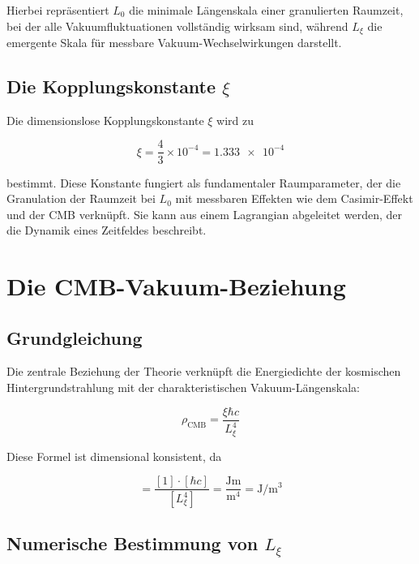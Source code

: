 	Hierbei repräsentiert \( L_0 \) die minimale Längenskala einer granulierten Raumzeit, bei der alle Vakuumfluktuationen vollständig wirksam sind, während \( L_\xi \) die emergente Skala für messbare Vakuum-Wechselwirkungen darstellt.
	
	\subsection{Die Kopplungskonstante \( \xi \)}
	
	Die dimensionslose Kopplungskonstante \( \xi \) wird zu
	
	\begin{equation}
		\xi = \frac{4}{3} \times 10^{-4} = \num{1.333e-4} \label{eq:coupling_constant}
	\end{equation}
	
	bestimmt. Diese Konstante fungiert als fundamentaler Raumparameter, der die Granulation der Raumzeit bei \( L_0 \) mit messbaren Effekten wie dem Casimir-Effekt und der CMB verknüpft. Sie kann aus einem Lagrangian abgeleitet werden, der die Dynamik eines Zeitfeldes beschreibt.
	
	\section{Die CMB-Vakuum-Beziehung}
	
	\subsection{Grundgleichung}
	
	Die zentrale Beziehung der Theorie verknüpft die Energiedichte der kosmischen Hintergrundstrahlung mit der charakteristischen Vakuum-Längenskala:
	
	\begin{equation}
		\rho_{\text{CMB}} = \frac{\xi \hbar c}{L_\xi^4} \label{eq:cmb_vacuum_relation}
	\end{equation}
	
	Diese Formel ist dimensional konsistent, da
	
	\begin{equation}
		[\rho_{\text{CMB}}] = \frac{[1] \cdot [\hbar c]}{[L_\xi^4]} = \frac{\si{\joule\meter}}{\si{\meter^4}} = \si{\joule\per\meter^3}
	\end{equation}
	
	\subsection{Numerische Bestimmung von \( L_\xi \)}
	
